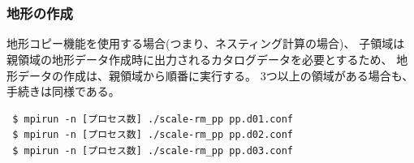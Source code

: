 ~\\
~\\



\subsubsection{地形の作成}

地形コピー機能を使用する場合(つまり、ネスティング計算の場合)、
子領域は親領域の地形データ作成時に出力されるカタログデータを必要とするため、
地形データの作成は、親領域から順番に実行する。
3つ以上の領域がある場合も、手続きは同様である。

\begin{verbatim}
 $ mpirun -n [プロセス数] ./scale-rm_pp pp.d01.conf
 $ mpirun -n [プロセス数] ./scale-rm_pp pp.d02.conf
 $ mpirun -n [プロセス数] ./scale-rm_pp pp.d03.conf
\end{verbatim}

